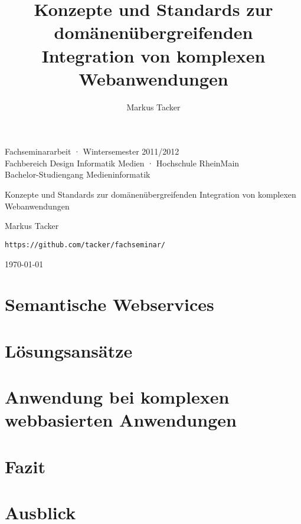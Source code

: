 \documentclass[10pt,a4paper]{article}
\begin{document}
\author{Markus Tacker}
\title{Konzepte und Standards zur domänenübergreifenden Integration von komplexen Webanwendungen}

\begin{center}

\begin{small}Fachseminararbeit · Wintersemester 2011/2012\\Fachbereich Design Informatik Medien · Hochschule RheinMain\\Bachelor-Studiengang Medieninformatik\end{small}

\bigskip

\begin{huge}Konzepte und Standards 
\medskip
zur domänenübergreifenden Integration
\medskip
von komplexen Webanwendungen\end{huge}

\bigskip

\begin{large}Markus Tacker\end{large}

\begin{small}\texttt{https://github.com/tacker/fachseminar/}\end{small}

\today

\end{center}



\pagebreak

\tableofcontents



\section{Semantische Webservices}
\label{l:sem-web-ser}


\section{Lösungsansätze}
\label{l:loesungen}



\section{Anwendung bei komplexen webbasierten Anwendungen}
\label{l:verwendung}
% 

\section{Fazit}
\label{l:fazit}
% 

\section{Ausblick}
\label{l:ausblick}
% 

\pagebreak




\end{document}
